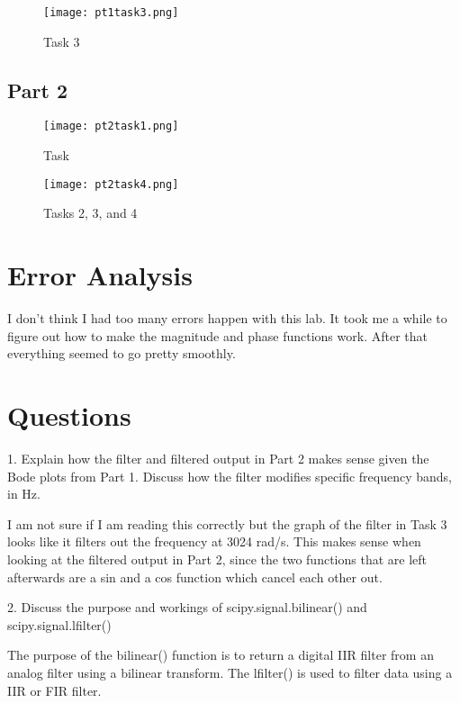 \documentclass[12pt]{report}
\begin{document}
\begin{figure}[H]
\begin{center}
\caption{Task 3}
\texttt{[image: pt1task3.png]}
\end{center}
\end{figure}

\subsection{Part 2}

\begin{figure}[H]
\begin{center}
\caption{Task}
\texttt{[image: pt2task1.png]}
\end{center}
\end{figure}

\begin{figure}[H]
\begin{center}
\caption{Tasks 2, 3, and 4}
\texttt{[image: pt2task4.png]}
\end{center}
\end{figure}

\section{Error Analysis}
I don't think I had too many errors happen with this lab. It took me
a while to figure out how to make the magnitude and phase functions
work. After that everything seemed to go pretty smoothly.

\section{Questions}
1. Explain how the filter and filtered output in Part 2 makes sense given
the Bode plots from Part 1. Discuss how the filter modifies specific
frequency bands, in Hz.

I am not sure if I am reading this correctly but the graph of the filter
in Task 3 looks like it filters out the frequency at 3024 rad/s. This
makes sense when looking at the filtered output in Part 2, since the
two functions that are left afterwards are a sin and a cos function
which cancel each other out.


2. Discuss the purpose and workings of scipy.signal.bilinear() and
scipy.signal.lfilter()

The purpose of the bilinear() function is to return a digital
IIR filter from an analog filter using a bilinear transform.
The lfilter() is used to filter data using a IIR or FIR filter.
\end{document}
